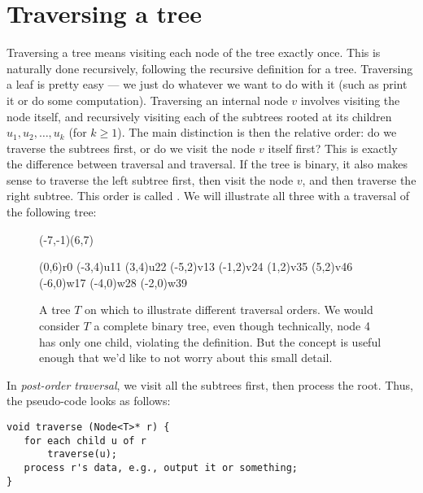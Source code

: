 \section{Traversing a tree}
\label{sec:trees.traversing}
Traversing a tree means visiting each node of the tree exactly once.
This is naturally done recursively, following the recursive definition
for a tree. Traversing a leaf is pretty easy --- we just do whatever we
want to do with it (such as print it or do some computation).
Traversing an internal node $v$ involves visiting the node itself, and
recursively visiting each of the subtrees rooted at its children
$u_1, u_2, \ldots, u_k$ (for $k \geq 1$). 
The main distinction is then the relative order: do we traverse the
subtrees first, or do we visit the node $v$ itself first? This is
exactly the difference between  traversal and
 traversal. 
If the tree is binary, it also makes sense to traverse the left
subtree first, then visit the node $v$, and then traverse the right
subtree. This order is called .
We will illustrate all three with a traversal of the following tree:

\begin{figure}[htb]
\begin{center}
\pspicture(-7,-1)(6,7)


\cnodeput(0,6){r}{0}
\cnodeput(-3,4){u1}{1}
\cnodeput(3,4){u2}{2}
\cnodeput(-5,2){v1}{3}
\cnodeput(-1,2){v2}{4}
\cnodeput(1,2){v3}{5}
\cnodeput(5,2){v4}{6}
\cnodeput(-6,0){w1}{7}
\cnodeput(-4,0){w2}{8}
\cnodeput(-2,0){w3}{9}

\endpspicture
\end{center}
\caption{A tree $T$ on which to illustrate different traversal orders.
We would consider $T$ a complete binary tree, even though technically,
node 4 has only one child, violating the definition. But the concept
is useful enough that we'd like to not worry about this small detail.}
\end{figure}

In \emph{post-order traversal}, we visit all the subtrees first, then
process the root. Thus, the pseudo-code looks as follows:

\begin{verbatim}
void traverse (Node<T>* r) {
   for each child u of r
       traverse(u);
   process r's data, e.g., output it or something;
}
\end{verbatim}

